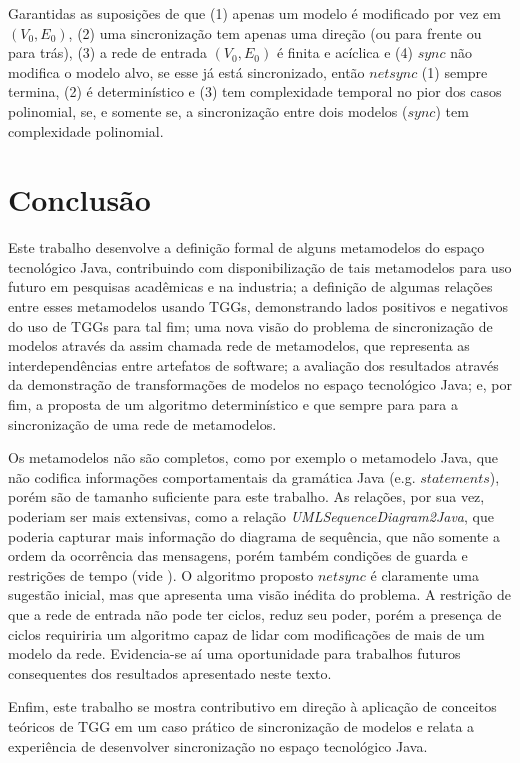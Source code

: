\documentclass[cic,resumo-unibral]{iiufrgs}
\begin{document}
\begin{extendedsummary}
Garantidas as suposições de que (1) apenas um modelo é modificado por vez em $(V_0,E_0)$, (2) uma sincronização tem apenas uma direção (ou para frente ou para trás), (3) a rede de entrada $(V_0,E_0)$ é finita e acíclica e (4) $sync$ não modifica o modelo alvo, se esse já está sincronizado, então $netsync$ (1) sempre termina, (2) é determinístico e (3) tem complexidade temporal no pior dos casos polinomial, se, e somente se, a sincronização entre dois modelos ($sync$) tem complexidade polinomial.

\section{Conclusão}
Este trabalho desenvolve a definição formal de alguns metamodelos do espaço tecnológico Java, contribuindo com disponibilização de tais metamodelos para uso futuro em pesquisas acadêmicas e na industria; a definição de algumas relações entre esses metamodelos usando TGGs, demonstrando lados positivos e negativos do uso de TGGs para tal fim; uma nova visão do problema de sincronização de modelos através da assim chamada rede de metamodelos, que representa as interdependências entre artefatos de software; a avaliação dos resultados através da demonstração de transformações de modelos no espaço tecnológico Java; e, por fim, a proposta de um algoritmo determinístico e que sempre para para a sincronização de uma rede de metamodelos.

Os metamodelos não são completos, como por exemplo o metamodelo Java, que não codifica informações comportamentais da gramática Java (e.g. $statements$), porém são de tamanho suficiente para este trabalho. As relações, por sua vez, poderiam ser mais extensivas, como a relação \textit{UMLSequenceDiagram2Java}, que poderia capturar mais informação do diagrama de sequência, que não somente a ordem da ocorrência das mensagens, porém também condições de guarda e restrições de tempo (vide \citet{omg2007unified}). O algoritmo proposto $netsync$ é claramente uma sugestão inicial, mas que apresenta uma visão inédita do problema. A restrição de que a rede de entrada não pode ter ciclos, reduz seu poder, porém a presença de ciclos requiriria um algoritmo capaz de lidar com modificações de mais de um modelo da rede. Evidencia-se aí uma oportunidade para trabalhos futuros consequentes dos resultados apresentado neste texto.
 
Enfim, este trabalho se mostra contributivo em direção à aplicação de conceitos teóricos de TGG em um caso prático de sincronização de modelos e relata a experiência de desenvolver sincronização no espaço tecnológico Java.



%




\end{extendedsummary}
\end{document}

